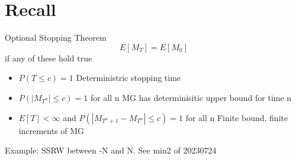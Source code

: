 \documentclass{report}
\begin{document}
  \section{Recall}%
    Optional Stopping Theorem
    \[ E[M_T] = E[M_0] \]
    if any of these hold true
    \begin{itemize}
      \item $P(T \leq c) = 1$
        Deterministric stopping time
      \item $P(|M_{T^n}| \leq c) = 1$ for all n
        MG has determinisitic upper bound for time n
      \item $E[T] < \infty$ and $P(|M_{T^n+1}-M_{T^n}| \leq c) = 1$ for all n
          Finite bound, finite increments of MG
    \end{itemize}
    Example: SSRW between -N and N.  See min2 of 20230724
\end{document}
